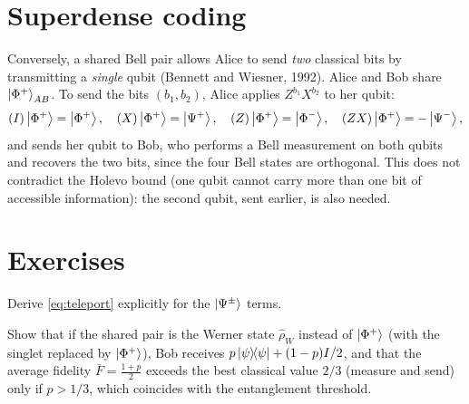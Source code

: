 \section{Superdense coding}
Conversely, a shared Bell pair allows Alice to send \emph{two} classical bits by transmitting a \emph{single} qubit (Bennett and Wiesner, 1992). Alice and Bob share $\left|\Phi^+\right\rangle_{AB}$.
To send the bits $(b_1,b_2)$, Alice applies $Z^{b_1}X^{b_2}$ to her qubit:
\begin{equation}
  (I)\left|\Phi^+\right\rangle=\left|\Phi^+\right\rangle,\quad(X)\left|\Phi^+\right\rangle=\left|\Psi^+\right\rangle,\quad(Z)\left|\Phi^+\right\rangle=\left|\Phi^-\right\rangle,\quad(ZX)\left|\Phi^+\right\rangle=-\left|\Psi^-\right\rangle,
\end{equation}
and sends her qubit to Bob, who performs a Bell measurement on both qubits and recovers the two bits, since the four Bell states are orthogonal. This does not contradict the
Holevo bound (one qubit cannot carry more than one bit of accessible information): the second qubit, sent earlier, is also needed.

\section{Exercises}
\begin{exercise}
Derive \cref{eq:teleport} explicitly for the $\left|\Psi^\pm\right\rangle$ terms.
\end{exercise}
\begin{exercise}
Show that if the shared pair is the Werner state $\hat\rho_W$ instead of $\left|\Phi^+\right\rangle$ (with the singlet replaced by $\left|\Phi^+\right\rangle$), Bob receives $p\left|\psi\middle\rangle\!\middle\langle\psi\right|+(1-p)I/2$, and that the
average fidelity $\bar F=\frac{1+p}2$ exceeds the best classical value $2/3$ (measure and send) only if $p>1/3$, which coincides with the entanglement threshold.
\end{exercise}
